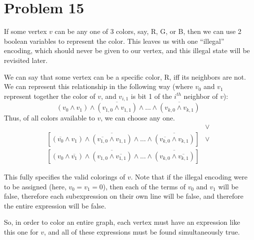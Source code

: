 \documentclass{article}
\providecommand{\prob}[1]{\section*{Problem #1}}
\begin{document}
\pagebreak
\prob{15}
If some vertex $v$ can be any one of 3 colors, say, R, G, or B, then we can use 2 boolean variables to represent the color.
This leaves us with one ``illegal'' encoding, which should never be given to our vertex, and this illegal state will be revisited later.

We can say that some vertex can be a specific color, R, iff its neighbors are not.
We can represent this relationship in the following way (where $v_0$ and $v_1$ represent together the color of $v$, and $v_{i, 1}$ is bit 1 of the $i^{th}$ neighbor of $v$):
\[
  (v_0 \land v_1) \land 
  \overline{(v_{1,0} \land v_{1,1})} \land \dots \land
  \overline{(v_{k,0} \land v_{k,1})} 
\]
Thus, of all colors available to $v$, we can choose any one.
\begin{align*}
  [
    (v_0 \land v_1) \land
    \overline{(v_{1,0} \land v_{1,1})} \land \dots \land
    \overline{(v_{k,0} \land v_{k,1})}
  ] &\lor\\ [
    (\overline{v_0} \land v_1) \land
    \overline{(\overline{v_{1,0}} \land v_{1,1})} \land \dots \land
    \overline{(\overline{v_{k,0}} \land v_{k,1})}
  ] &\lor\\ [
    (v_0 \land \overline{v_1}) \land
    \overline{(v_{1,0} \land \overline{v_{1,1}})} \land \dots \land
    \overline{(v_{k,0} \land \overline{v_{k,1}})}
  ]
\end{align*}

This fully specifies the valid colorings of $v$.
Note that if the illegal encoding were to be assigned (here, $v_0 = v_1 = 0$), then each of the terms of $v_0$ and $v_1$ will be false, therefore each subexpression on their own line will be false, and therefore the entire expression will be false.

So, in order to color an entire graph, each vertex must have an expression like this one for $v$, and all of these expressions must be found simultaneously true.
\end{document}
